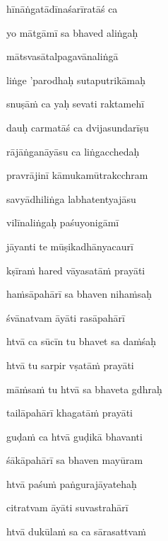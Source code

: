 \ujvers\nemsloka 
hīnāṅgatādīnaśarīratāś ca
\dontdisplaylinenum

\nemslokab 
yo mātgāmī sa bhaved aliṅgaḥ \danda\dontdisplaylinenum

\nemslokac 
mātsvasātalpagavānaliṅgā
\dontdisplaylinenum

\nemslokad 
liṅge 'parodhaḥ sutaputrikāmaḥ \veg\dontdisplaylinenum

\ujvers\nemsloka 
snuṣāṁ ca yaḥ sevati raktamehī
\dontdisplaylinenum

\nemslokab 
dauḥ carmatāś ca dvijasundarīṣu \danda\dontdisplaylinenum

\nemslokac 
rājāṅganāyāsu ca liṅgacchedaḥ
\dontdisplaylinenum

\nemslokad 
pravrājinī kāmukamūtrakcchram \veg\dontdisplaylinenum

\ujvers\nemsloka 
savyādhiliṅga labhatentyajāsu
\dontdisplaylinenum

\nemslokab 
vilīnaliṅgaḥ paśuyonigāmī \danda\dontdisplaylinenum

\nemslokac 
jāyanti te mūṣikadhānyacaurī
\dontdisplaylinenum

\nemslokad 
kṣīraṁ hared vāyasatāṁ prayāti \veg\dontdisplaylinenum

\ujvers\nemsloka 
haṁsāpahārī sa bhaven nihaṁsaḥ
\dontdisplaylinenum

\nemslokab 
śvānatvam āyāti rasāpahārī \danda\dontdisplaylinenum

\nemslokac 
htvā ca sūcīn tu bhavet sa daṁśaḥ
\dontdisplaylinenum

\nemslokad 
htvā tu sarpir vṣatāṁ prayāti \veg\dontdisplaylinenum

\ujvers\nemsloka 
māṁsaṁ tu htvā sa bhaveta gdhraḥ
\dontdisplaylinenum

\nemslokab 
tailāpahārī khagatāṁ prayāti \danda\dontdisplaylinenum

\nemslokac 
guḍaṁ ca htvā guḍikā bhavanti
\dontdisplaylinenum

\nemslokad 
śākāpahārī sa bhaven mayūram \veg\dontdisplaylinenum

\ujvers\nemsloka 
htvā paśuṁ paṅgurajāyatehaḥ
\dontdisplaylinenum

\nemslokab 
citratvam āyāti suvastrahārī \danda\dontdisplaylinenum

\nemslokac 
htvā dukūlaṁ sa ca sārasattvaṁ
\dontdisplaylinenum


